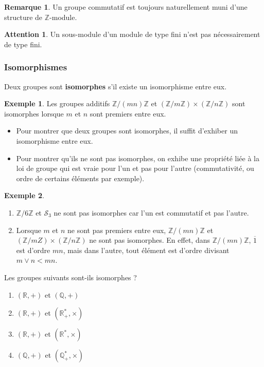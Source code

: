 \documentclass[french]{article}
\newcommand{\Z}{\mathbb{Z}}
\newcommand{\Q}{\mathbb{Q}}
\newcommand{\R}{\mathbb{R}}
\newcommand{\st}{^*}
\theoremstyle{plain}
\theoremstyle{definition}
\newtheorem*{ex}{Exemple}
\newtheorem*{rmq}{Remarque}
\newtheorem*{attention}{Attention}
\theoremstyle{remark}
\begin{document}
\begin{rmq}
	Un groupe commutatif est toujours naturellement muni d'une structure de $\Z$-module.
\end{rmq}

\begin{attention}
	Un sous-module d'un module de type fini n'est pas nécessairement de type fini.
\end{attention}


\subsubsection*{Isomorphismes}

\begin{dfn}
	Deux groupes sont \textbf{isomorphes} s'il existe un isomorphisme entre eux.
\end{dfn}

\begin{ex}
	Les groupes additifs $\Z/(mn)\Z$ et $(\Z/m\Z)\times(\Z/n\Z)$ sont isomorphes lorsque $m$ et $n$ sont premiers entre eux.
\end{ex}

\begin{met}
	\begin{itemize}
		\item Pour montrer que deux groupes sont isomorphes, il suffit d'exhiber un isomorphisme entre eux.
		\item Pour montrer qu'ils ne sont pas isomorphes, on exhibe une propriété liée à la loi de groupe qui est vraie pour l'un et pas pour l'autre (commutativité, ou ordre de certains éléments par exemple).
	\end{itemize}
\end{met}

\begin{ex}
	\begin{enumerate}
		\item $\Z/6\Z$ et $\mathcal{S}_3$ ne sont pas isomorphes car l'un est commutatif et pas l'autre.
		\item Lorsque $m$ et $n$ ne sont pas premiers entre eux, $\Z/(mn)\Z$ et $(\Z/mZ)\times(\Z/n\Z)$ ne sont pas isomorphes. En effet, dans $\Z/(mn)\Z$, $\overline{1}$ est d'ordre $mn$, mais dans l'autre, tout élément est d'ordre divisant $m\vee n<mn$.
	\end{enumerate}
\end{ex}

\begin{exo}
	Les groupes suivants sont-ils isomorphes ?
	\begin{enumerate}
		\item $(\R,+)$ et $(\Q,+)$ %
		\item $(\R,+)$ et $(\R_+\st,\times)$ %
		\item $(\R,+)$ et $(\R\st,\times)$ %
		\item $(\Q,+)$ et $(\Q_+\st,\times)$ %
	\end{enumerate}
\end{exo}
\end{document}
